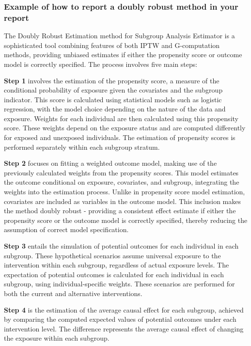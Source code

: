 \documentclass[
  singlecolumn]{article}
\begin{document}
\hypertarget{example-of-how-to-report-a-doubly-robust-method-in-your-report}{%
\subsubsection{Example of how to report a doubly robust method in your
report}\label{example-of-how-to-report-a-doubly-robust-method-in-your-report}}

The Doubly Robust Estimation method for Subgroup Analysis Estimator is a
sophisticated tool combining features of both IPTW and G-computation
methods, providing unbiased estimates if either the propensity score or
outcome model is correctly specified. The process involves five main
steps:

\textbf{Step 1} involves the estimation of the propensity score, a
measure of the conditional probability of exposure given the covariates
and the subgroup indicator. This score is calculated using statistical
models such as logistic regression, with the model choice depending on
the nature of the data and exposure. Weights for each individual are
then calculated using this propensity score. These weights depend on the
exposure status and are computed differently for exposed and unexposed
individuals. The estimation of propensity scores is performed separately
within each subgroup stratum.

\textbf{Step 2} focuses on fitting a weighted outcome model, making use
of the previously calculated weights from the propensity scores. This
model estimates the outcome conditional on exposure, covariates, and
subgroup, integrating the weights into the estimation process. Unlike in
propensity score model estimation, covariates are included as variables
in the outcome model. This inclusion makes the method doubly robust -
providing a consistent effect estimate if either the propensity score or
the outcome model is correctly specified, thereby reducing the
assumption of correct model specification.

\textbf{Step 3} entails the simulation of potential outcomes for each
individual in each subgroup. These hypothetical scenarios assume
universal exposure to the intervention within each subgroup, regardless
of actual exposure levels. The expectation of potential outcomes is
calculated for each individual in each subgroup, using
individual-specific weights. These scenarios are performed for both the
current and alternative interventions.

\textbf{Step 4} is the estimation of the average causal effect for each
subgroup, achieved by comparing the computed expected values of
potential outcomes under each intervention level. The difference
represents the average causal effect of changing the exposure within
each subgroup.
\end{document}
